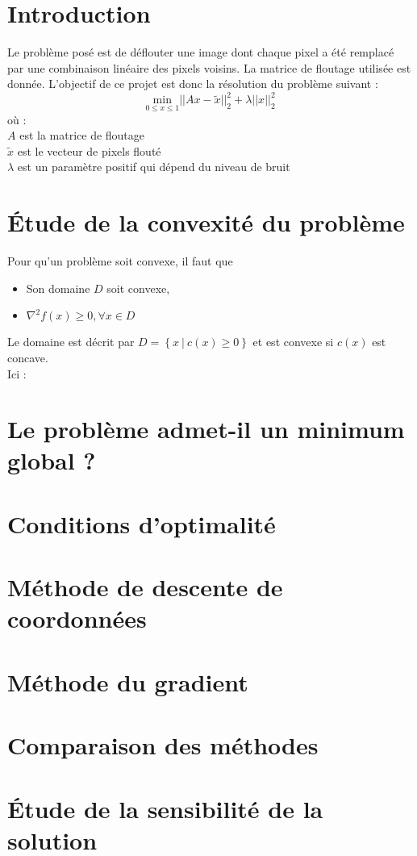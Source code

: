 \documentclass[12pt, a4paper]{report}
\begin{document}
\umonsCoverPage
\tableofcontents
\clearpage
\section{Introduction}
Le problème posé est de déflouter une image dont chaque pixel a été remplacé par une combinaison linéaire des pixels voisins. La matrice de floutage utilisée est donnée. L'objectif de ce projet est donc la résolution du problème suivant :\\
\[\underset{0 \leq x \leq 1}{\mathrm{min}} ||Ax - \tilde{x}||_2^2 + \lambda||x||_2^2\]
où :\\
$A$ est la matrice de floutage\\
$\tilde{x}$ est le vecteur de pixels flouté\\
$\lambda$ est un paramètre positif qui dépend du niveau de bruit\\

\section{Étude de la convexité du problème}
Pour qu'un problème soit convexe, il faut que
\begin{itemize}
\item Son domaine $ D $ soit convexe,
\item $\nabla^2f(x) \geqslant 0, \forall x \in D$
\end{itemize}

Le domaine est décrit par \( D = \left\{ x\ |\ c(x) \geq 0 \right\} \) et est convexe si $c(x)$ est concave.\\
Ici : 


\section{Le problème admet-il un minimum global ?}

\section{Conditions d'optimalité}

\section{Méthode de descente de coordonnées}

\section{Méthode du gradient}

\section{Comparaison des méthodes}

\section{Étude de la sensibilité de la solution}
\end{document}
